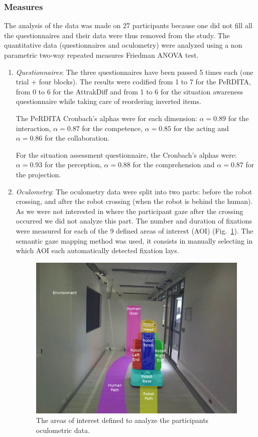 \documentclass[a4paper,11pt,twoside]{StyleThese}
\begin{document}
\subsubsection{Measures}
The analysis of the data was made on 27 participants because one did not fill all the questionnaires and their data were thus removed from the study. The quantitative data (questionnaires and oculometry) were analyzed using a non parametric two-way repeated measures Friedman ANOVA test.
\begin{enumerate}


\item \textit{Questionnaires}:
The three questionnaires have been passed 5 times each (one trial + four blocks). The results were codified from 1 to 7 for the PeRDITA, from 0 to 6 for the AttrakDiff and from 1 to 6 for the situation awareness questionnaire while taking care of reordering inverted items.

The PeRDITA Cronbach's alphas were for each dimension: $\alpha = 0.89$ for the interaction, $\alpha = 0.87$ for the competence, $\alpha = 0.85$ for the acting and $\alpha = 0.86$ for the collaboration.

For the situation assessment questionnaire, the Cronbach's alphas were: $\alpha = 0.93$ for the perception, $\alpha = 0.88$ for the comprehension and $\alpha = 0.87$ for the projection.

\item \textit{Oculometry}:
The oculometry data were split into two parts: before the robot crossing, and after the robot crossing (when the robot is behind the human). As we were not interested in where the participant gaze after the crossing occurred we did not analyze this part. The number and duration of fixations were measured for each of the 9 defined areas of interest (AOI) (Fig.~\ref{fig:aois}). The semantic gaze mapping method was used, it consists in manually selecting in which AOI each automatically detected fixation lays.

\begin{figure}[hbtp]
\centering
\includegraphics[scale=0.4]{figures/chapter2/pr2_aois_2.png}
\caption{The areas of interest defined to analyze the participants oculometric data.}
\label{fig:aois}
\end{figure}


\end{enumerate}
\end{document}
